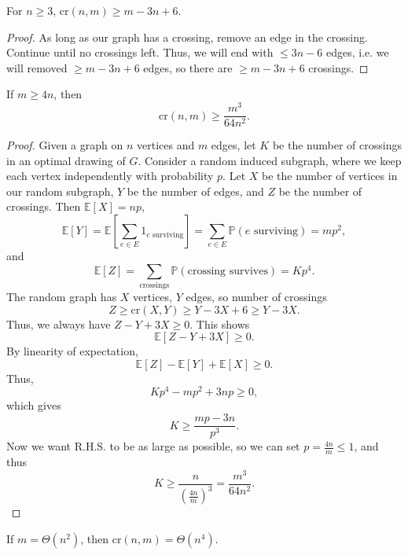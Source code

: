 \begin{corollary}
    For \(n \ge 3\), \(\mathrm{cr}(n, m) \ge m - 3n + 6 \). 
\end{corollary}

\begin{proof}
    As long as our graph has a crossing, remove an edge in the crossing. Continue until no crossings left. Thus, we will end with \(\le 3n - 6\) edges, i.e. we will removed \(\ge m - 3n + 6\) edges, so there are \(\ge m - 3n + 6\) crossings.   
\end{proof}

\begin{theorem}
    If \(m \ge 4n\), then 
    \[
        \mathrm{cr}(n, m) \ge \frac{m^3}{64 n^2}. 
    \] 
\end{theorem}

\begin{proof}
    Given a graph on \(n\) vertices and \(m\) edges, let \(K\) be the number of crossings in an optimal drawing of \(G\). Consider a random induced subgraph, where we keep each vertex independently with probability \(p\). Let \(X\) be the number of vertices in our random subgraph, \(Y\) be the number of edges, and \(Z\) be the number of crossings. Then \(\mathbb{E} [X] = np\), 
    \[
        \mathbb{E} [Y] = \mathbb{E} \left[ \sum_{e \in E} 1_{e \text{ surviving} }  \right] = \sum_{e \in E} \mathbb{P} \left( e \text{ surviving}  \right) = mp^2,   
    \]         
    and 
    \[
        \mathbb{E} [Z] = \sum_{\text{crossings}} \mathbb{P} (\text{crossing survives}) = K p^4. 
    \]
    The random graph has \(X\) vertices, \(Y\) edges, so number of crossings
    \[
        Z \ge \mathrm{cr}(X, Y) \ge Y - 3X + 6 \ge Y - 3 X. 
    \]  
    Thus, we always have \(Z - Y + 3X \ge 0\). This shows 
    \[
        \mathbb{E} [Z - Y + 3X] \ge 0.
    \]
    By linearity of expectation,
    \[
        \mathbb{E} [Z] - \mathbb{E} [Y] + \mathbb{E} [X] \ge 0.
    \]
    Thus,
    \[
        K p^4 - m p^2 + 3 n p \ge 0,
    \]
    which gives 
    \[
        K \ge \frac{mp - 3n}{p^3}.
    \]
    Now we want R.H.S. to be as large as possible, so we can set \(p = \frac{4n}{m} \le 1\), and thus 
    \[
        K \ge \frac{n}{\left( \frac{4n}{m} \right)^3 } = \frac{m^3}{64 n^2}.
    \] 
\end{proof}

\begin{remark}
    If \(m = \Theta \left( n^2 \right) \), then \(\mathrm{cr}(n, m) = \Theta \left( n^4 \right)  \).  
\end{remark}

